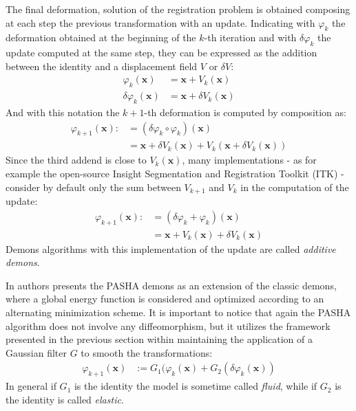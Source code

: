 The final deformation, solution of the registration problem is obtained composing at each step the previous transformation with an update. Indicating with $\varphi_{k}$ the deformation obtained at the beginning of the $k$-th iteration and with $\delta \varphi_{k}$ the update computed at the same step, they can be expressed as the addition between the identity and a displacement field $V$ or $\delta V$:
\begin{align*}
	\varphi_{k}(\mathbf{x}) &= \mathbf{x} + V_{k}(\mathbf{x}) \\ 
	\delta \varphi_{k}(\mathbf{x}) &= \mathbf{x} + \delta V_{k}(\mathbf{x}) 
\end{align*}
And with this notation the $k+1$-th deformation is computed by composition as:
\begin{align*}
\varphi_{k+1}(\mathbf{x})  :&= (\delta \varphi_{k}\circ \varphi_{k})(\mathbf{x}) \\
&= \mathbf{x} + \delta V_{k}(\mathbf{x}) + V_{k}(\mathbf{x} + \delta V_{k}(\mathbf{x}))
\end{align*}
Since the third addend is close to $V_{k}(\mathbf{x})$, many implementations - as for example the open-source Insight Segmentation and Registration Toolkit (ITK) \cite{yoo2002engineering} - consider by default only the sum between 
$ V_{k+1}$ and $V_{k}$ in the computation of the update:
\begin{align*}
\varphi_{k+1}(\mathbf{x})  :&= (\delta \varphi_{k} + \varphi_{k})(\mathbf{x}) \\
&= \mathbf{x} + V_{k}(\mathbf{x}) + \delta V_{k}(\mathbf{x})
\end{align*}
Demons algorithms with this implementation of the update are called \emph{additive demons}.

In \cite{cachier2003iconic} authors presents the PASHA demons as an extension of the classic demons, where a global energy function is considered and optimized according to an alternating minimization scheme. 
It is important to notice that again the PASHA algorithm does not involve any diffeomorphism, but it utilizes the framework presented in the previous section within maintaining the application of a Gaussian filter $G$ to smooth the transformations:
\begin{align*}
\varphi_{k+1}(\mathbf{x})  &:= G_{1}(\varphi_{k}(\mathbf{x}) + G_{2}(\delta \varphi_{k}(\mathbf{x}))
\end{align*}
In general if $G_{1}$ is the identity the model is sometime called \emph{fluid}, while if $G_{2}$ is the identity is called \emph{elastic}.

